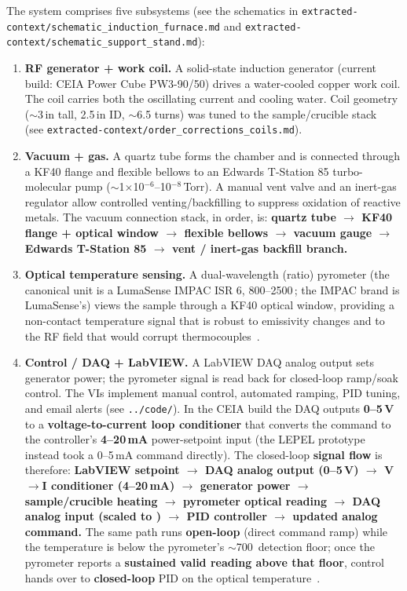 \documentclass[5p,times]{elsarticle}
\begin{document}
The system comprises five subsystems (see the schematics in
\texttt{extracted-context/schematic\_induction\_furnace.md} and
\texttt{extracted-context/schematic\_support\_stand.md}):

\begin{enumerate}[nosep]
\item \textbf{RF generator + work coil.} A solid-state induction generator (current
build: CEIA Power Cube PW3-90/50) drives a water-cooled copper work coil. The coil
carries both the oscillating current and cooling water. Coil geometry ($\sim$3\,in
tall, 2.5\,in ID, $\sim$6.5 turns) was tuned to the sample/crucible stack~\cite{vankan2024electromagneticinductionheating} (see
\texttt{extracted-context/order\_corrections\_coils.md}).

\item \textbf{Vacuum + gas.} A quartz tube forms the chamber and is connected through
a KF40 flange and flexible bellows to an Edwards T-Station 85 turbo-molecular pump
($\sim$1$\times$10$^{-6}$--10$^{-8}$\,Torr). A manual vent valve and an inert-gas
regulator allow controlled venting/backfilling to suppress oxidation of reactive
metals. The vacuum connection stack, in order, is: \textbf{quartz tube $\rightarrow$
KF40 flange + optical window $\rightarrow$ flexible bellows $\rightarrow$ vacuum
gauge $\rightarrow$ Edwards T-Station 85 $\rightarrow$ vent / inert-gas backfill
branch.}

\item \textbf{Optical temperature sensing.} A dual-wavelength (ratio) pyrometer (the
canonical unit is a LumaSense IMPAC ISR 6, 800--2500\,\celsius; the IMPAC brand is
LumaSense's) views the sample through a KF40 optical window, providing a non-contact
temperature signal that is robust to emissivity changes and to the RF field that
would corrupt thermocouples~\cite{ham2016insituspectralemissivity,suleiman2025improvingpyrometryof,usamentiaga2014infraredthermographyfor}.

\item \textbf{Control / DAQ + LabVIEW.} A LabVIEW DAQ analog output sets generator
power; the pyrometer signal is read back for closed-loop ramp/soak control. The VIs
implement manual control, automated ramping, PID tuning, and email alerts (see
\texttt{../code/}). In the CEIA build the DAQ outputs \textbf{0--5\,V} to a
\textbf{voltage-to-current loop conditioner} that converts the command to the
controller's \textbf{4--20\,mA} power-setpoint input (the LEPEL prototype instead
took a 0--5\,mA command directly). The closed-loop \textbf{signal flow} is therefore:
\textbf{LabVIEW setpoint $\rightarrow$ DAQ analog output (0--5\,V) $\rightarrow$
V$\rightarrow$I conditioner (4--20\,mA) $\rightarrow$ generator power $\rightarrow$
sample/crucible heating $\rightarrow$ pyrometer optical reading $\rightarrow$ DAQ
analog input (scaled to \celsius) $\rightarrow$ PID controller $\rightarrow$ updated
analog command.} The same path runs \textbf{open-loop} (direct command ramp) while
the temperature is below the pyrometer's $\sim$700\,\celsius{} detection floor; once
the pyrometer reports a \textbf{sustained valid reading above that floor}, control
hands over to \textbf{closed-loop} PID on the optical temperature~\cite{meng2023designofvacuum}.


\end{enumerate}
\end{document}
